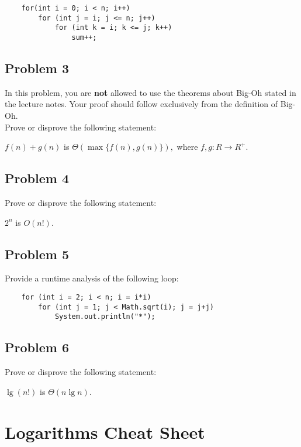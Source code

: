 \begin{verbatim}
    for(int i = 0; i < n; i++)
        for (int j = i; j <= n; j++)
            for (int k = i; k <= j; k++)
                sum++;
\end{verbatim}

\subsection*{Problem 3}
In this problem, you are \textbf{not} allowed to use the theorems about Big-Oh stated in the lecture notes. Your proof should follow exclusively from the definition of Big-Oh.\\

Prove or disprove the following statement:
\begin{center}
    $f(n) + g(n)$ is $\Theta(\max\big\{f(n),g(n)\big\}),$ where $f, g:R\rightarrow R^{+}$.
\end{center}

\subsection*{Problem 4}
Prove or disprove the following statement:
\begin{center}
    $2^n$ is $O(n!)$.
\end{center}

\subsection*{Problem 5}
Provide a runtime analysis of the following loop:

\begin{verbatim}
    for (int i = 2; i < n; i = i*i)
        for (int j = 1; j < Math.sqrt(i); j = j+j)
            System.out.println("*");
\end{verbatim}

\subsection*{Problem 6}
Prove or disprove the following statement:

\begin{center}
    $\lg(n!)$ is $\Theta(n\lg{n})$.
\end{center}

\newpage

\section*{Logarithms Cheat Sheet}

